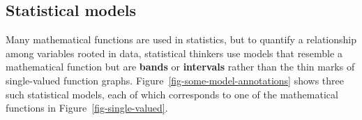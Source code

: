 \documentclass[
  letterpaper,
  DIV=11,
  numbers=noendperiod,
  oneside]{scrartcl}
\begin{document}
\subsection{Statistical models}\label{statistical-models}

Many mathematical functions are used in statistics, but to quantify a
relationship among variables rooted in data, statistical thinkers use
models that resemble a mathematical function but are \textbf{bands} or
\textbf{intervals} rather than the thin marks of single-valued function
graphs. Figure~\ref{fig-some-model-annotations} shows three such
statistical models, each of which corresponds to one of the mathematical
functions in Figure~\ref{fig-single-valued}.

\begin{figure}

\end{figure}
\end{document}
